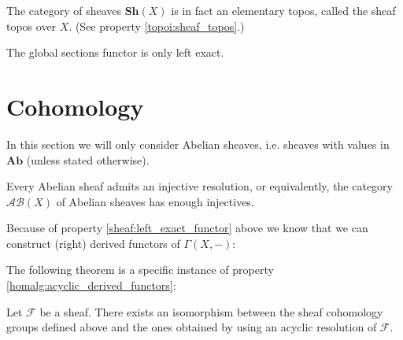     \begin{property}
        The category of sheaves $\mathbf{Sh}(X)$ is in fact an elementary topos, called the sheaf topos over $X$. (See property \ref{topoi:sheaf_topos}.)
    \end{property}

    \begin{property}\label{sheaf:left_exact_functor}
        The global sections functor is only left exact.
    \end{property}

\section{Cohomology}

    In this section we will only consider Abelian sheaves, i.e. sheaves with values in $\mathbf{Ab}$ (unless stated otherwise).

    \begin{property}
        Every Abelian sheaf admits an injective resolution, or equivalently, the category $\mathcal{AB}(X)$ of Abelian sheaves has enough injectives.
    \end{property}
    Because of property \ref{sheaf:left_exact_functor} above we know that we can construct (right) derived functors of $\Gamma(X,-)$:

    The following theorem is a specific instance of property \ref{homalg:acyclic_derived_functors}:
    \begin{theorem}
        Let $\mathcal{F}$ be a sheaf. There exists an isomorphism between the sheaf cohomology groups defined above and the ones obtained by using an acyclic resolution of $\mathcal{F}$.
    \end{theorem}


